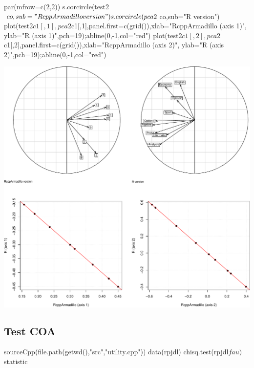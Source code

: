 \documentclass[
  10pt,
]{article}
\newenvironment{Shaded}{\begin{snugshade}}{\end{snugshade}}
\newcommand{\NormalTok}[1]{#1}
\begin{document}
\begin{Shaded}
\begin{Highlighting}[]
\NormalTok{par(mfrow=c(2,2))}
\NormalTok{s.corcircle(test2$co,sub="RcppArmadillo version")}
\NormalTok{s.corcircle(pca2$co,sub="R version")}
\NormalTok{plot(test2$c1[,1],pca2$c1[,1],panel.first=c(grid()),xlab="RcppArmadillo (axis 1)",}
\NormalTok{     ylab="R (axis 1)",pch=19);abline(0,{-}1,col="red")}
\NormalTok{plot(test2$c1[,2],pca2$c1[,2],panel.first=c(grid()),xlab="RcppArmadillo (axis 2)",}
\NormalTok{     ylab="R (axis 2)",pch=19);abline(0,{-}1,col="red")}
\end{Highlighting}
\end{Shaded}

\includegraphics{RandPytonAnalysisPDF_files/figure-latex/unnamed-chunk-56-1.pdf}

\hypertarget{test-coa}{%
\subsection{Test COA}\label{test-coa}}

\begin{Shaded}
\begin{Highlighting}[]
\NormalTok{sourceCpp(file.path(getwd(),"src","utility.cpp"))}
\NormalTok{data(rpjdl)}
\NormalTok{chisq.test(rpjdl$fau)$statistic}
\end{Highlighting}
\end{Shaded}
\end{document}
